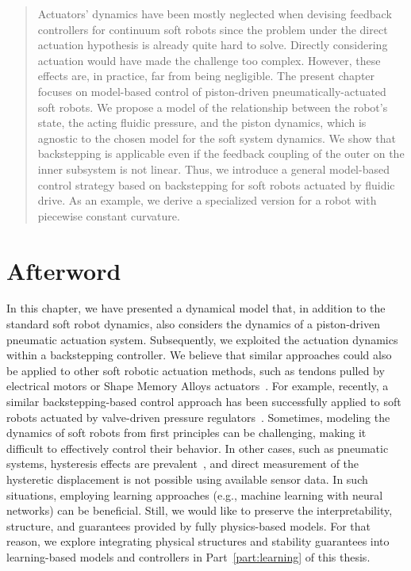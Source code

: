 \pagebreak

\begin{abstract}
    Actuators' dynamics have been mostly neglected when devising feedback controllers for continuum soft robots since the problem under the direct actuation hypothesis is already quite hard to solve. Directly considering actuation would have made the challenge too complex. However, these effects are, in practice, far from being negligible. The present chapter focuses on model-based control of piston-driven pneumatically-actuated soft robots. We propose a model of the relationship between the robot's state, the acting fluidic pressure, and the piston dynamics, which is agnostic to the chosen model for the soft system dynamics. 
    We show that backstepping is applicable even if the feedback coupling of the outer on the inner subsystem is not linear.
    Thus, we introduce a general model-based control strategy based on backstepping for soft robots actuated by fluidic drive. As an example, we derive a specialized version for a robot with piecewise constant curvature. 
\end{abstract}


\newpage








\section*{Afterword}
In this chapter, we have presented a dynamical model that, in addition to the standard soft robot dynamics, also considers the dynamics of a piston-driven pneumatic actuation system. Subsequently, we exploited the actuation dynamics within a backstepping controller.
We believe that similar approaches could also be applied to other soft robotic actuation methods, such as tendons pulled by electrical motors or Shape Memory Alloys actuators~\citep{zaidi2021actuation}.
For example, recently, a similar backstepping-based control approach has been successfully applied to soft robots actuated by valve-driven pressure regulators~\citep{franco2024model}.
Sometimes, modeling the dynamics of soft robots from first principles can be challenging, making it difficult to effectively control their behavior. In other cases, such as pneumatic systems, hysteresis effects are prevalent~\citep{vo2010new}, and direct measurement of the hysteretic displacement is not possible using available sensor data.
In such situations, employing learning approaches (e.g., machine learning with neural networks) can be beneficial. Still, we would like to preserve the interpretability, structure, and guarantees provided by fully physics-based models. For that reason, we explore integrating physical structures and stability guarantees into learning-based models and controllers in Part~\ref{part:learning} of this thesis.
